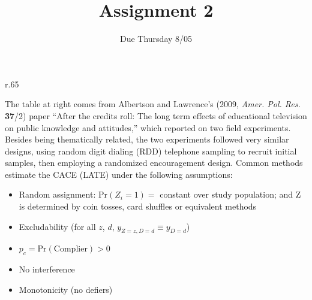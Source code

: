 \documentclass{article}
\title{Assignment 2}
\author{Due Thursday 8/05}
\begin{document}
\maketitle

\begin{minipage}{1.0\linewidth}

\begin{wrapfigure}{r}{.65\linewidth}
\end{wrapfigure}

The table at right comes from Albertson and Lawrence's (2009, \textit{Amer. Pol. Res.} \textbf{37}/2) paper ``After the credits roll: The long term effects of educational television on public knowledge and attitudes,'' which reported on two field experiments. Besides being thematically related, the two experiments followed very similar designs, using random digit dialing (RDD) telephone sampling to recruit initial samples, then employing a randomized encouragement design.  Common methods estimate the CACE (LATE) under the following assumptions:

\begin{itemize}
\item Random assignment: $\mathrm{Pr}(Z_{i}=1) = $ constant over study population;  and $\mathrm{Z} $ is determined by coin tosses, card shuffles or equivalent methods
\item Excludability (for all $z$, $d$, $y_{Z=z, D=d} \equiv y_{D=d}$)
\item $p_{c} = \mathrm{Pr}(\mathrm{Complier}) > 0$ 
\item No interference 
\item Monotonicity (no defiers) 
\end{itemize}
  
\end{minipage}
\vspace{4ex}
\end{document}
